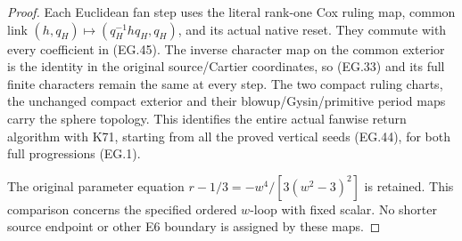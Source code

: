 \begin{proof}
Each Euclidean fan step uses
the literal rank-one Cox ruling
map, common link
\((h,q_H)\mapsto(q_H^{-1}hq_H,q_H)\),
and its actual native reset.
They commute with every
coefficient in (EG.45).
The inverse character map on
the common exterior is the
identity in the original
source/Cartier coordinates,
so (EG.33) and its full finite
characters remain the same
at every step. The two compact
ruling charts, the unchanged
compact exterior and their
blowup/Gysin/primitive period
maps carry the sphere topology.
This identifies the entire
actual fanwise return algorithm
with K71, starting from all
the proved vertical seeds
(EG.44), for both full
progressions (EG.1).

The original parameter equation
\(r-1/3=-w^4/[3(w^2-3)^2]\)
is retained. This comparison
concerns the specified ordered
\(w\)-loop with fixed scalar.
No shorter source endpoint or
other E6 boundary is assigned
by these maps.
\end{proof}
